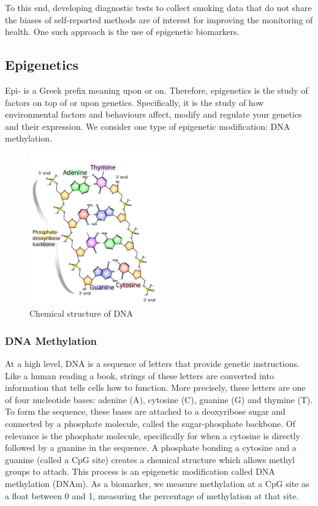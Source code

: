 \documentclass{article}
\begin{document}
To this end, developing diagnostic tests to collect smoking data that do not share the biases of self-reported methods are of interest for improving the monitoring of health. One such approach is the use of epigenetic biomarkers.

\subsection{Epigenetics}
Epi- is a Greek prefix meaning upon or on. Therefore, epigenetics is the study of factors on top of or upon genetics. Specifically, it is the study of how environmental factors and behaviours affect, modify and regulate your genetics and their expression. We consider one type of epigenetic modification: DNA methylation.

\begin{figure}
    \centering
    \includegraphics[width=0.5\textwidth]{512px-DNA_chemical_structure.svg.png}
    \caption*{Chemical structure of DNA \cite{ball_DNA_structure}}
\end{figure}

\subsubsection{DNA Methylation}
At a high level, DNA is a sequence of letters that provide genetic instructions. Like a human reading a book, strings of these letters are converted into information that tells cells how to function. More precisely, these letters are one of four nucleotide bases: adenine (A), cytosine (C), guanine (G) and thymine (T). To form the sequence, these bases are attached to a deoxyribose sugar and connected by a phosphate molecule, called the sugar-phosphate backbone. Of relevance is the phosphate molecule, specifically for when a cytosine is directly followed by a guanine in the sequence. A phosphate bonding a cytosine and a guanine (called a CpG site) creates a chemical structure which allows methyl groups to attach. This process is an epigenetic modification called DNA methylation (DNAm). As a biomarker, we measure methylation at a CpG site as a float between 0 and 1, measuring the percentage of methylation at that site.
\end{document}
